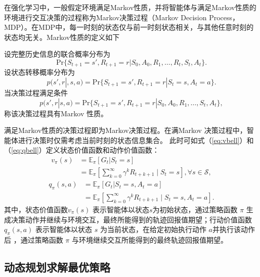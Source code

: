 在强化学习中，一般假定环境满足Markov性质，并将智能体与满足Markov性质的环境进行交互决策的过程称为Markov决策过程（Markov Decision Process，MDP）\cite{white1963dynamic,ross1996stochastic}。在MDP中，每一时刻的状态仅与前一时刻状态相关，与其他任意时刻的状态均无关。Markov性质的定义如下
\begin{definition}
设完整历史信息的联合概率分布为
\begin{equation}
    \mathrm{Pr}\{S_{t+1}=s',R_{t+1}=r|S_0,A_0,R_1,\ldots,R_t,S_t,A_t\}.
\end{equation}
设状态转移概率分布为
\begin{equation}
    p(s',r|,s,a) = \mathrm{Pr}\{S_{t+1}=s',R_{t+1}=r|S_t=s,A_t=a\}.
\end{equation}
当决策过程满足条件
\begin{equation}
  p(s',r|s,a) = \mathrm{Pr}\{S_{t+1}=s',R_{t+1}=r|S_0,A_0,R_1,\ldots,S_t,A_t\},
\end{equation}
称该决策过程具有Markov 性质。
\end{definition}

满足Markov性质的决策过程即为Markov决策过程\cite{sutton2018reinforcement,white1963dynamic}。在满Markov 决策过程中，智能体进行决策时仅需考虑当前时刻的状态信息集合。
此时可如式（\ref{eq:vbell}）和（\ref{eq:qbell}）定义状态价值函数和动作价值函数：
\begin{equation}\label{eq:vbell}
\begin{aligned}
    v_{\pi}(s)&=\mathbb{E}_{\pi}\left[G_t|S_t=s\right]\\
    &=\mathbb{E}_{\pi}\left[\sum_{k=0}^{\infty}\gamma^kR_{t+k+1}\mid S_t=s\right], \forall s \in \mathcal{S},
\end{aligned}
\end{equation}
\begin{equation}\label{eq:qbell}
\begin{aligned}
    q_{\pi}(s,a)&=\mathbb{E}_{\pi}\left[G_t|S_t=s,A_t=a\right]\\
    &=\mathbb{E}_{\pi}\left[\sum_{k=0}^{\infty}\gamma^kR_{t+k+1}\mid S_t=s,A_t=a\right].
\end{aligned}
\end{equation}
其中，状态价值函数$v_\pi(s)$ 表示智能体以状态$s$为初始状态，通过策略函数 $\pi$ 生成决策动作并继续与环境交互，最终所能得到的轨迹回报值期望；行动价值函数 $q_\pi(s,a)$ 表示智能体以状态 $s$ 为当前状态，在给定初始执行动作 $a$并执行该动作后 ，通过策略函数 $\pi$ 与环境继续交互所能得到的最终轨迹回报值期望。

\subsection{动态规划求解最优策略}

